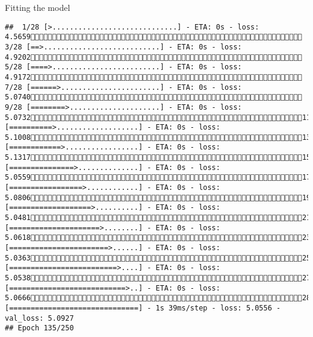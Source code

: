 \documentclass[
  ignorenonframetext,
]{beamer}
\begin{document}
\begin{frame}[fragile]{Fitting the model}
\begin{verbatim}
##  1/28 [>.............................] - ETA: 0s - loss: 4.5659 3/28 [==>...........................] - ETA: 0s - loss: 4.9202 5/28 [====>.........................] - ETA: 0s - loss: 4.9172 7/28 [======>.......................] - ETA: 0s - loss: 5.0740 9/28 [========>.....................] - ETA: 0s - loss: 5.073211/28 [==========>...................] - ETA: 0s - loss: 5.100813/28 [============>.................] - ETA: 0s - loss: 5.131715/28 [===============>..............] - ETA: 0s - loss: 5.055917/28 [=================>............] - ETA: 0s - loss: 5.080619/28 [===================>..........] - ETA: 0s - loss: 5.048121/28 [=====================>........] - ETA: 0s - loss: 5.061823/28 [=======================>......] - ETA: 0s - loss: 5.036325/28 [=========================>....] - ETA: 0s - loss: 5.053827/28 [===========================>..] - ETA: 0s - loss: 5.066628/28 [==============================] - 1s 39ms/step - loss: 5.0556 - val_loss: 5.0927
## Epoch 135/250

\end{verbatim}
\end{frame}
\end{document}
